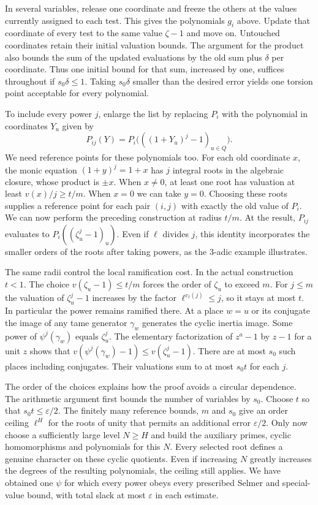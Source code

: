 \documentclass[11pt,letterpaper]{article}
\begin{document}
In several variables, release one coordinate and freeze the others at the values currently assigned to each test. This gives the polynomials $g_i$ above. Update that coordinate of every test to the same value $\zeta-1$ and move on. Untouched coordinates retain their initial valuation bounds. The argument for the product also bounds the sum of the updated evaluations by the old sum plus $\delta$ per coordinate. Thus one initial bound for that sum, increased by one, suffices throughout if $s_0\delta\le1$. Taking $s_0\delta$ smaller than the desired error yields one torsion point acceptable for every polynomial.

To include every power $j$, enlarge the list by replacing $P_i$ with the polynomial in coordinates $Y_u$ given by
\[
              P_{ij}(Y)=P_i\bigl(((1+Y_u)^j-1)_{u\in Q}\bigr).
\]
We need reference points for these polynomials too. For each old coordinate $x$, the monic equation $(1+y)^j=1+x$ has $j$ integral roots in the algebraic closure, whose product is $\pm x$. When $x\ne0$, at least one root has valuation at least $v(x)/j\ge t/m$. When $x=0$ we can take $y=0$. Choosing these roots supplies a reference point for each pair $(i,j)$ with exactly the old value of $P_i$. We can now perform the preceding construction at radius $t/m$. At the result, $P_{ij}$ evaluates to $P_i((\zeta_u^j-1)_u)$. Even if $\ell$ divides $j$, this identity incorporates the smaller orders of the roots after taking powers, as the $3$-adic example illustrates.

The same radii control the local ramification cost. In the actual construction $t<1$. The choice $v(\zeta_u-1)\le t/m$ forces the order of $\zeta_u$ to exceed $m$. For $j\le m$ the valuation of $\zeta_u^j-1$ increases by the factor $\ell^{v_\ell(j)}\le j$, so it stays at most $t$. In particular the power remains ramified there. At a place $w=u$ or its conjugate the image of any tame generator $\gamma_w$ generates the cyclic inertia image. Some power of $\psi^j(\gamma_w)$ equals $\zeta_u^j$. The elementary factorization of $z^a-1$ by $z-1$ for a unit $z$ shows that $v(\psi^j(\gamma_w)-1)\le v(\zeta_u^j-1)$. There are at most $s_0$ such places including conjugates. Their valuations sum to at most $s_0t$ for each $j$.

The order of the choices explains how the proof avoids a circular dependence. The arithmetic argument first bounds the number of variables by $s_0$. Choose $t$ so that $s_0t\le\varepsilon/2$. The finitely many reference bounds, $m$ and $s_0$ give an order ceiling $\ell^H$ for the roots of unity that permits an additional error $\varepsilon/2$. Only now choose a sufficiently large level $N\ge H$ and build the auxiliary primes, cyclic homomorphisms and polynomials for this $N$. Every selected root defines a genuine character on these cyclic quotients. Even if increasing $N$ greatly increases the degrees of the resulting polynomials, the ceiling still applies. We have obtained one $\psi$ for which every power obeys every prescribed Selmer and special-value bound, with total slack at most $\varepsilon$ in each estimate.
\end{document}
